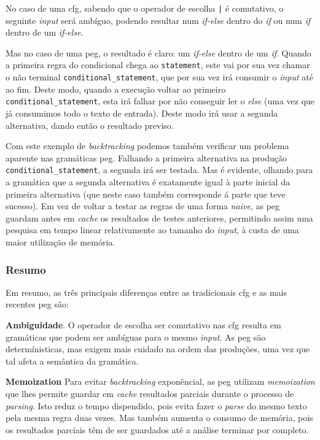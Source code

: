 \documentclass[
  oneside,
  11pt, a4paper,
  footinclude=true,
  headinclude=true,
  cleardoublepage=empty
]{scrbook}
\begin{document}
No caso de uma \acrshort{cfg}, sabendo que o operador de escolha \texttt{|} é comutativo, o seguinte \textit{input} será ambíguo, podendo resultar num \textit{if-else} dentro do \textit{if} ou num \textit{if} dentro de um \textit{if-else}.

Mas no caso de uma \acrshort{peg}, o resultado é claro: um \textit{if-else} dentro de um \textit{if}. Quando a primeira regra do condicional chega ao \texttt{statement}, este vai por sua vez chamar o não terminal \texttt{conditional\_statement}, que por sua vez irá consumir o \textit{input} até ao fim. Deste modo, quando a execução voltar ao primeiro \texttt{conditional\_statement}, esta irá falhar por não conseguir ler o \textit{else} (uma vez que já consumimos todo o texto de entrada). Deste modo irá usar a segunda alternativa, dando então o resultado previso.

Com este exemplo de \textit{backtracking} podemos também verificar um problema aparente nas gramáticas \acrshort{peg}. Falhando a primeira alternativa na produção \texttt{conditional\_statement}, a segunda irá ser testada. Mas é evidente, olhando para a gramática que a segunda alternativa é exatamente igual à parte inicial da primeira alternativa (que neste caso também corresponde á parte que teve sucesso). Em vez de voltar a testar as regras de uma forma \textit{naive}, as \acrlong{peg} guardam antes em \textit{cache} os resultados de testes anteriores, permitindo assim uma pesquisa em tempo linear relativamente ao tamanho do \textit{input}, à custa de uma maior utilização de memória.


\subsubsection{Resumo}
Em resumo, as três principais diferenças entre as tradicionais \acrfull{cfg} e as mais recentes \acrfull{peg} são:

\textbf{Ambiguidade}. O operador de escolha ser comutativo nas \acrshort{cfg} resulta em gramáticas que podem ser ambíguas para o mesmo \textit{input}. As \acrshort{peg} são determínisticas, mas exigem mais cuidado na ordem das produções, uma vez que tal afeta a semântica da gramática.

\textbf{Memoization} Para evitar \textit{backtracking} exponêncial, as \acrshort{peg} utilizam \textit{memoization} que lhes permite guardar em \textit{cache} resultados parciais durante o processo de \textit{parsing}. Isto reduz o tempo dispendido, pois evita fazer o \textit{parse} do mesmo texto pela mesma regra duas vezes. Mas também aumenta o consumo de memória, pois os resultados parciais têm de ser guardados até a análise terminar por completo.
\end{document}
